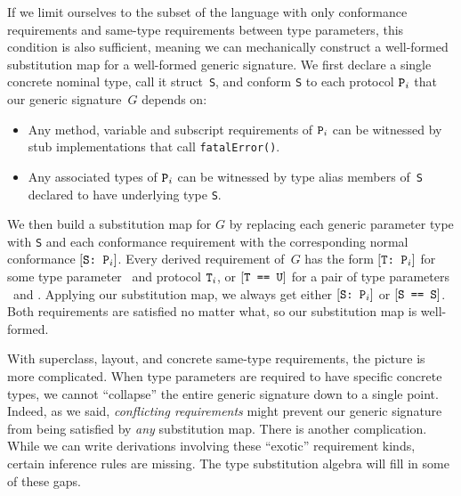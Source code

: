 \documentclass[../generics]{subfiles}
\begin{document}
If we limit ourselves to the subset of the language with only conformance requirements and same-type requirements between type parameters, this condition is also sufficient, meaning we can mechanically construct a well-formed substitution map for a well-formed generic signature. We first declare a single concrete nominal type, call it struct~\texttt{S}, and conform \texttt{S} to each protocol $\texttt{P}_i$ that our generic signature~$G$ depends on:
\begin{itemize}
\item Any method, variable and subscript requirements of $\texttt{P}_i$ can be witnessed by stub implementations that call \texttt{fatalError()}.
\item Any associated types of $\texttt{P}_i$ can be witnessed by type alias members of~\texttt{S} declared to have underlying type \texttt{S}.
\end{itemize}
We then build a substitution map for $G$ by replacing each generic parameter type with \texttt{S} and each conformance requirement with the corresponding normal conformance $[\texttt{S:~$\texttt{P}_i$}]$. Every derived requirement of~$G$ has the form $[\texttt{T:~$\texttt{P}_i$}]$ for some type parameter \tT\ and protocol $\texttt{T}_i$, or $[\texttt{T == U}]$ for a pair of type parameters \tT\ and \tU. Applying our substitution map, we always get either $[\texttt{S:~$\texttt{P}_i$}]$ or $[\texttt{S == S}]$. Both requirements are satisfied no matter what, so our substitution map is well-formed.

With superclass, layout, and concrete same-type requirements, the picture is more complicated. When type parameters are required to have specific concrete types, we cannot ``collapse'' the entire generic signature down to a single point. Indeed, as we said, \emph{conflicting requirements} might prevent our generic signature from being satisfied by \emph{any} substitution map. There is another complication. While we can write derivations involving these ``exotic'' requirement kinds, certain inference rules are missing. The type substitution algebra will fill in some of these gaps.
\end{document}
